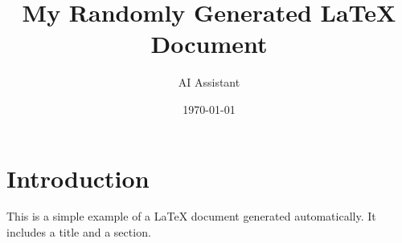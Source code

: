\documentclass{article}
\title{My Randomly Generated LaTeX Document}
\author{AI Assistant}
\date{\today}
\begin{document}
\maketitle

\section{Introduction}
This is a simple example of a LaTeX document generated automatically. It includes a title and a section.
\end{document}
